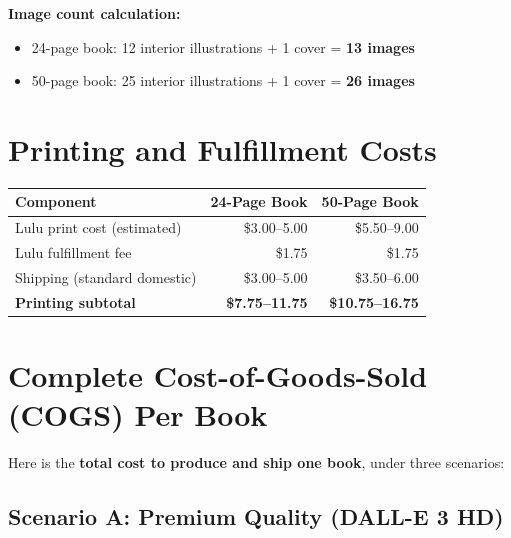 \documentclass[12pt, letterpaper, oneside]{book}
\begin{document}
\noindent \textbf{Image count calculation:}
\begin{itemize}[leftmargin=2em]
  \item 24-page book: 12 interior illustrations + 1 cover = \textbf{13 images}
  \item 50-page book: 25 interior illustrations + 1 cover = \textbf{26 images}
\end{itemize}

\section{Printing and Fulfillment Costs}

\begin{table}[H]
\centering
\begin{tabular}{lrr}
\toprule
\textbf{Component} & \textbf{24-Page Book} & \textbf{50-Page Book} \\
\midrule
Lulu print cost (estimated) & \$3.00--5.00 & \$5.50--9.00 \\
Lulu fulfillment fee & \$1.75 & \$1.75 \\
Shipping (standard domestic) & \$3.00--5.00 & \$3.50--6.00 \\
\midrule
\textbf{Printing subtotal} & \textbf{\$7.75--11.75} & \textbf{\$10.75--16.75} \\
\bottomrule
\end{tabular}
\end{table}

\section{Complete Cost-of-Goods-Sold (COGS) Per Book}

Here is the \textbf{total cost to produce and ship one book}, under three scenarios:

\subsection{Scenario A: Premium Quality (DALL-E 3 HD)}
\end{document}
